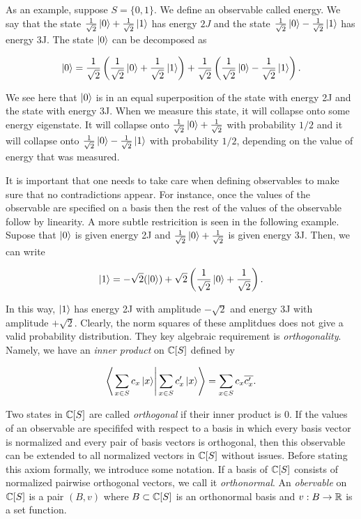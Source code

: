 As an example, suppose $S=\{0,1\}$. We define an observable called energy. We say that the state $\frac{1}{\sqrt{2}}\left|0\right>+\frac{1}{\sqrt{2}}\left|1\right>$ has energy $2J$ and the state $\frac{1}{\sqrt{2}}\left|0\right>-\frac{1}{\sqrt{2}}\left|1\right>$ has energy 3J. The state $\left|0\right>$ can be decomposed as

$$\left|0\right>=\frac{1}{\sqrt{2}}\left(\frac{1}{\sqrt{2}}\left|0\right>+\frac{1}{\sqrt{2}}\left|1\right>\right)+\frac{1}{\sqrt{2}}\left(\frac{1}{\sqrt{2}}\left|0\right>-\frac{1}{\sqrt{2}}\left|1\right>\right).$$

We see here that $\left|0\right>$ is in an equal superposition of the state with energy 2J and the state with energy 3J. When we measure this state, it will collapse onto some energy eigenstate. It will collapse onto $\frac{1}{\sqrt{2}}\left|0\right>+\frac{1}{\sqrt{2}}$ with probability $1/2$ and it will collapse onto $\frac{1}{\sqrt{2}}\left|0\right>-\frac{1}{\sqrt{2}}\left|1\right>$ with probability $1/2$, depending on the value of energy that was measured.

It is important that one needs to take care when defining observables to make sure that no contradictions appear. For instance, once the values of the observable are specified on a basis then the rest of the values of the observable follow by linearity. A more subtle restricition is seen in the following example. Supose that $\left|0\right>$ is given energy 2J and $\frac{1}{\sqrt{2}}\left|0\right>+\frac{1}{\sqrt{2}}$ is given energy 3J. Then, we can write

$$\left|1\right>=-\sqrt{2}(\left|0\right>)+\sqrt{2}\left(\frac{1}{\sqrt{2}}\left|0\right>+\frac{1}{\sqrt{2}}\right).$$

In this way, $\left|1\right>$ has energy 2J with amplitude $-\sqrt{2}$ and energy 3J with amplitude $+\sqrt{2}$. Clearly, the norm squares of these amplitdues does not give a valid probability distribution. They key algebraic requirement is \textit{orthogonality}. Namely, we have an \textit{inner product} on $\mathbb{C}[S]$ defined by

$$\left<\left.\sum_{x\in S}c_x\ket{x}\right| \sum_{x\in S}c'_x \ket{x}\right>=\sum_{x\in S}c_x\overline{c_x'}.$$

Two states in $\mathbb{C}[S]$ are called \textit{orthogonal} if their inner product is $0$. If the values of an observable are specififed with respect to a basis in which every basis vector is normalized and every pair of basis vectors is orthogonal, then this observable can be extended to all normalized vectors in $\mathbb{C}[S]$ without issues. Before stating this axiom formally, we introduce some notation. If a basis of $\mathbb{C}[S]$ consists of normalized pairwise orthogonal vectors, we call it \textit{orthonormal}. An \textit{obervable} on $\mathbb{C}[S]$ is a pair $(B,v)$ where $B\subset \mathbb{C}[S]$ is an orthonormal basis and $v:B\to \mathbb{R}$ is a set function.

